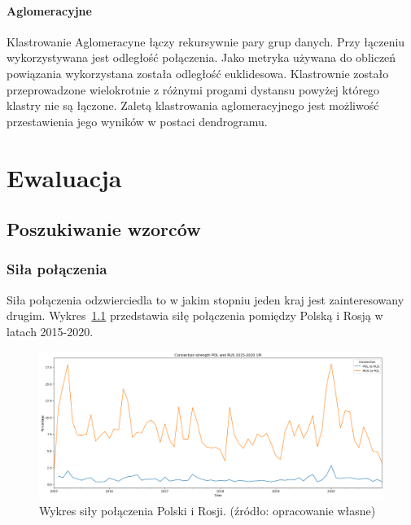 \documentclass[11pt]{report}
\begin{document}

    \subsubsection{Aglomeracyjne}
    Klastrowanie Aglomeracyne łączy rekursywnie pary grup danych.
    Przy łączeniu wykorzystywana jest odległość połączenia.
    Jako metryka używana do obliczeń powiązania wykorzystana została odległość euklidesowa.
    Klastrownie zostało przeprowadzone wielokrotnie z różnymi progami dystansu powyżej którego klastry nie są łączone.
    Zaletą klastrowania aglomeracyjnego jest możliwość przestawienia jego wyników w postaci dendrogramu.


    \chapter{Ewaluacja}\label{ch:ewaluacja}


    \section{Poszukiwanie wzorców}\label{sec:poszukiwanie-wzorców}

    \subsection{Siła połączenia}
    Siła połączenia odzwierciedla to w jakim stopniu jeden kraj jest zainteresowany drugim.
    Wykres~\ref{fig:POL and RUSconnection 1M} przedstawia siłę połączenia pomiędzy Polską i Rosją w latach 2015-2020.

    \begin{figure}[!ht]
        \centering
        \includegraphics[width=\linewidth]{../spade_proto/figures/symmetry/POL and RUSconnection 1M.png}
        \caption{Wykres siły połączenia Polski i Rosji. (źródło: opracowanie własne)}
        \label{fig:POL and RUSconnection 1M}
    \end{figure}
\end{document}
